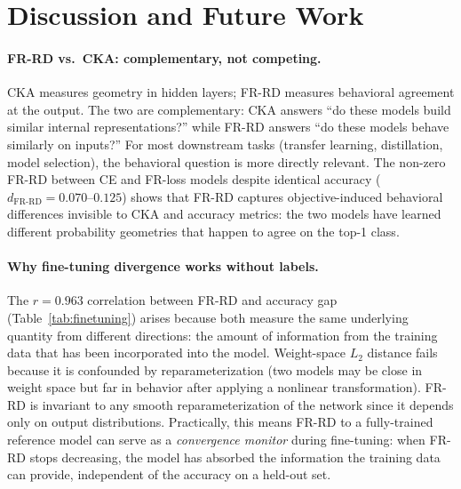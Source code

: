 \documentclass[11pt]{article}
\begin{document}
\section{Discussion and Future Work}

\paragraph{FR-RD vs.\ CKA: complementary, not competing.}
CKA measures geometry in hidden layers; FR-RD measures behavioral agreement at the output.
The two are complementary: CKA answers ``do these models build similar internal
representations?'' while FR-RD answers ``do these models behave similarly on inputs?'' For
most downstream tasks (transfer learning, distillation, model selection), the behavioral
question is more directly relevant. The non-zero FR-RD between CE and FR-loss models despite
identical accuracy ($d_\mathrm{FR\text{-}RD} = 0.070$--$0.125$) shows that FR-RD captures
objective-induced behavioral differences invisible to CKA and accuracy metrics: the two
models have learned different probability geometries that happen to agree on the top-1 class.

\paragraph{Why fine-tuning divergence works without labels.}
The $r = 0.963$ correlation between FR-RD and accuracy gap (Table~\ref{tab:finetuning})
arises because both measure the same underlying quantity from different directions: the
amount of information from the training data that has been incorporated into the model.
Weight-space $L_2$ distance fails because it is confounded by reparameterization (two models
may be close in weight space but far in behavior after applying a nonlinear transformation).
FR-RD is invariant to any smooth reparameterization of the network since it depends only on
output distributions. Practically, this means FR-RD to a fully-trained reference model can
serve as a \emph{convergence monitor} during fine-tuning: when FR-RD stops decreasing, the
model has absorbed the information the training data can provide, independent of the
accuracy on a held-out set.
\end{document}
